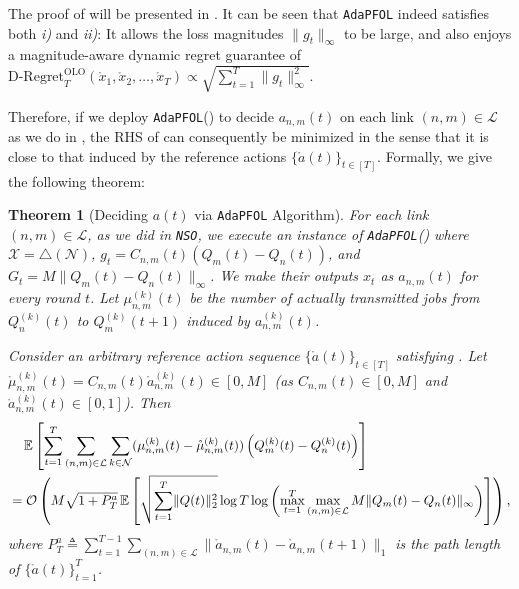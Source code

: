 \documentclass[11pt,fullpage,letterpaper]{article} %
\newtheorem{theorem}{Theorem}[section]
\renewcommand{\bm}[1]{#1}%
\renewcommand{\O}{\operatorname{\mathcal O}}
\newcommand{\E}{\operatornamewithlimits{\mathbb{E}}}
\newcommand{\mN}{{\mathcal N}}
\newcommand{\mL}{{\mathcal L}}
\newcommand{\SSAlg}{\texttt{NSO}\xspace}
\newcommand{\OLOAlg}{\texttt{AdaPFOL}\xspace}
\begin{document}
The proof of  will be presented in .
It can be seen that \OLOAlg indeed satisfies both \textit{i)} and \textit{ii)}: It allows the loss magnitudes $\lVert \bm g_t\rVert_\infty$ to be large, and also enjoys a magnitude-aware dynamic regret guarantee of $\text{D-Regret}_T^{\text{OLO}}(\mathring{\bm x}_1,\mathring{\bm x}_2,\ldots,\mathring{\bm x}_T)\propto \sqrt{\sum_{t=1}^T \lVert \bm g_t\rVert_\infty^2}$.

Therefore, if we deploy \OLOAlg () to decide $\bm a_{n,m}(t)$ on each link $(n,m)\in \mL$ as we do in , the RHS of  can consequently be minimized in the sense that it is close to that induced by the reference actions $\{\mathring{\bm a}(t)\}_{t\in [T]}$. Formally, we give the following theorem:
\begin{theorem}[Deciding $\bm a(t)$ via \OLOAlg Algorithm]\label{thm:multi-hop stability decision making}
For each link $(n,m)\in \mL$, as we did in \SSAlg, we execute an instance of \OLOAlg () where $\mathcal X=\triangle(\mN)$, $\bm g_t=C_{n,m}(t) (\bm Q_m(t) - \bm Q_n(t))$, and $G_t=M\lVert \bm Q_m(t)-\bm Q_n(t)\rVert_\infty$. We make their outputs $\bm x_t$ as $\bm a_{n,m}(t)$ for every round $t$. Let $\mu_{n,m}^{(k)}(t)$ be the number of actually transmitted jobs from $Q_n^{(k)}(t)$ to $Q_m^{(k)}(t+1)$ induced by $a_{n,m}^{(k)}(t)$.

Consider an arbitrary reference action sequence $\{\mathring{\bm a} (t)\}_{t\in [T]}$ satisfying . Let $\mathring{\mu}_{n,m}^{(k)} (t)=C_{n,m}(t) \mathring{a}_{n,m}^{(k)} (t)\in [0,M]$ (as $C_{n,m}(t)\in [0,M]$ and $\mathring a_{n,m}^{(k)}(t)\in [0,1]$). Then
\begin{align*}
&\quad \E\left [\sum_{t=1}^T \sum_{(n,m)\in \mL} \sum_{k\in \mN} (\mu_{n,m}^{(k)}(t)-\mathring{\mu}_{n,m}^{(k)}(t))\left (Q_m^{(k)}(t)-Q_n^{(k)}(t)\right )\right ]\\
&=\O\left (M\sqrt{1+P_T^a} \E\left [\sqrt{\sum_{t=1}^T \lVert \bm Q(t)\rVert_2^2} \log T \log \left (\max_{t=1}^T \max_{(n,m)\in \mL} M \lVert \bm Q_m(t) - \bm Q_n(t)\rVert_\infty\right )\right ]\right )\text{,}
\end{align*}
where $P_T^a\triangleq \sum_{t=1}^{T-1} \sum_{(n,m)\in \mL} \lVert \mathring{\bm a}_{n,m}(t) - \mathring{\bm a}_{n,m}(t+1)\rVert_1$ is the path length of $\{\mathring{\bm a}(t)\}_{t=1}^T$.
\end{theorem}
\end{document}
